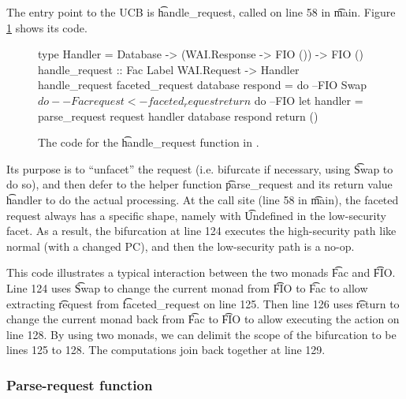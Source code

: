 \begin{refsection}
The entry point to the UCB is \t{handle\_request},
called on line 58 in \t{main}.
%
Figure \ref{code_handle_request} shows its code.
\begin{figure}
\begin{fb}
type Handler = Database -> (WAI.Response -> FIO ()) -> FIO ()
handle_request :: Fac Label WAI.Request -> Handler
handle_request faceted_request database respond = do  --FIO
  Swap $ do  --Fac
    request <- faceted_request
    return $ do  --FIO
      let handler = parse_request request
      handler database respond
  return ()
\end{fb}
\caption{The code for the \t{handle\_request} function in \viF{}.}
\label{code_handle_request}
\end{figure}
Its purpose is to ``unfacet'' the request (i.e. bifurcate if necessary, using \t{Swap} to do so),
and then defer to the helper function \t{parse\_request} and its return value \t{handler} to do the actual processing.
%
At the call site (line 58 in \t{main}),
the faceted request always has a specific shape,
namely with \t{Undefined} in the low-security facet.
%
As a result, the bifurcation at line 124 executes the high-security path like normal (with a changed PC),
and then the low-security path is a no-op.

This code illustrates a typical interaction between the two monads \t{Fac} and \t{FIO}.
%
Line 124 uses \t{Swap} to change the current monad from \t{FIO} to \t{Fac} to allow extracting \t{request} from \t{faceted\_request} on line 125.
%
Then line 126 uses \t{return} to change the current monad back from \t{Fac} to \t{FIO} to allow executing the action on line 128.
%
By using two monads, we can delimit the scope of the bifurcation to be lines 125 to 128.
%
The computations join back together at line 129.

\subsubsection{Parse-request function}


\end{refsection}
